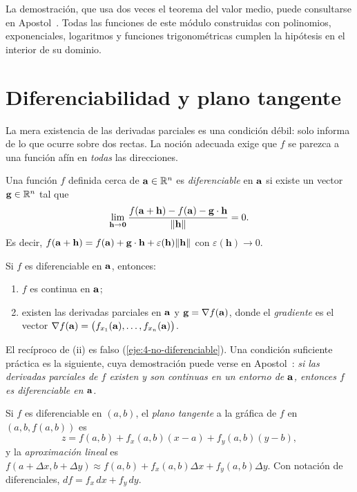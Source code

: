La demostración, que usa dos veces el teorema del valor medio, puede consultarse en Apostol~\cite[cap.~8]{apostol2}. Todas las funciones de este módulo construidas con polinomios, exponenciales, logaritmos y funciones trigonométricas cumplen la hipótesis en el interior de su dominio.

\section{Diferenciabilidad y plano tangente}

La mera existencia de las derivadas parciales es una condición débil: solo informa de lo que ocurre sobre dos rectas. La noción adecuada exige que $f$ se parezca a una función afín en \emph{todas} las direcciones.

\begin{definicion}[Diferenciabilidad]\label{def:diferenciable}
Una función $f$ definida cerca de $\mathbf{a}\in\mathbb{R}^n$ es \emph{diferenciable} en $\mathbf{a}$ si existe un vector $\mathbf g\in\mathbb{R}^n$ tal que
\[
\lim_{\mathbf h\to\mathbf{0}}\frac{f(\mathbf{a}+\mathbf h)-f(\mathbf{a})-\mathbf g\cdot\mathbf h}{\lVert\mathbf h\rVert}=0 .
\]
Es decir, $f(\mathbf{a}+\mathbf h)=f(\mathbf{a})+\mathbf g\cdot\mathbf h+\varepsilon(\mathbf h)\lVert\mathbf h\rVert$ con $\varepsilon(\mathbf h)\to0$.
\end{definicion}

\begin{teorema}\label{teo:diferenciable}
Si $f$ es diferenciable en $\mathbf{a}$, entonces:
\begin{enumerate}
  \item $f$ es continua en $\mathbf{a}$;
  \item existen las derivadas parciales en $\mathbf{a}$ y $\mathbf g=\nabla f(\mathbf{a})$, donde el \emph{gradiente} es el vector $\nabla f(\mathbf{a})=\bigl(f_{x_1}(\mathbf{a}),\dots,f_{x_n}(\mathbf{a})\bigr)$.
\end{enumerate}
\end{teorema}

El recíproco de (ii) es falso (\cref{eje:4-no-diferenciable}). Una condición suficiente práctica es la siguiente, cuya demostración puede verse en Apostol~\cite[cap.~8]{apostol2}: \emph{si las derivadas parciales de $f$ existen y son continuas en un entorno de $\mathbf{a}$, entonces $f$ es diferenciable en $\mathbf{a}$.}

\begin{definicion}\label{def:tangente}
Si $f$ es diferenciable en $(a,b)$, el \emph{plano tangente} a la gráfica de $f$ en $(a,b,f(a,b))$ es
\[
z=f(a,b)+f_x(a,b)(x-a)+f_y(a,b)(y-b),
\]
y la \emph{aproximación lineal} es $f(a+\Delta x,b+\Delta y)\approx f(a,b)+f_x(a,b)\Delta x+f_y(a,b)\Delta y$. Con notación de diferenciales, $df=f_x\,dx+f_y\,dy$.
\end{definicion}

